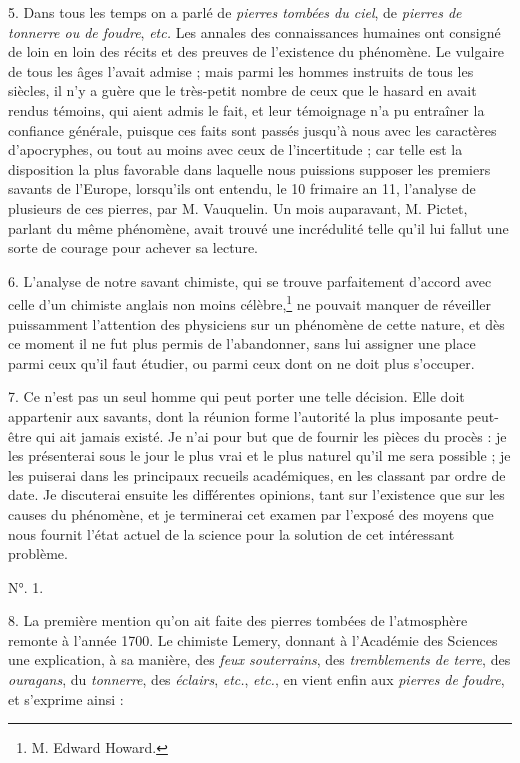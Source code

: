 \documentclass[a4paper, 11pt, oneside, polutonikogreek, french]{article}
\begin{document}
5. Dans tous les temps on a parlé de \emph{pierres tombées du ciel}, de \emph{pierres de tonnerre ou de foudre}, \emph{etc.} Les annales des connaissances humaines ont consigné de loin en loin des récits et des preuves de l'existence du phénomène. Le vulgaire de tous les âges l'avait admise ; mais parmi les hommes instruits de tous les siècles, il n'y a guère que le très-petit nombre de ceux que le hasard en avait rendus témoins, qui aient admis le fait, et leur témoignage n'a pu entraîner la confiance générale, puisque ces faits sont passés jusqu'à nous avec les caractères d'apocryphes, ou tout au moins avec ceux de l'incertitude ; car telle est la disposition la plus favorable dans laquelle nous puissions supposer les premiers savants de l'Europe, lorsqu'ils ont entendu, le 10 frimaire an 11, l'analyse de plusieurs de ces pierres, par M. Vauquelin. Un mois auparavant, M. Pictet, parlant du même phénomène, avait trouvé une incrédulité telle qu'il lui fallut une sorte de courage pour achever sa lecture.

6. L'analyse de notre savant chimiste, qui se trouve parfaitement d'accord avec celle d'un chimiste anglais non moins célèbre,\footnote{M. Edward Howard.} ne pouvait manquer de réveiller puissamment l'attention des physiciens sur un phénomène de cette nature, et dès ce moment il ne fut plus permis de l'abandonner, sans lui assigner une place parmi ceux qu'il faut étudier, ou parmi ceux dont on ne doit plus s'occuper.

7. Ce n'est pas un seul homme qui peut porter une telle décision. Elle doit appartenir aux savants, dont la réunion forme l'autorité la plus imposante peut-être qui ait jamais existé. Je n'ai pour but que de fournir les pièces du procès : je les présenterai sous le jour le plus vrai et le plus naturel qu'il me sera possible ; je les puiserai dans les principaux recueils académiques, en les classant par ordre de date. Je discuterai ensuite les différentes opinions, tant sur l'existence que sur les causes du phénomène, et je terminerai cet examen par l'exposé des moyens que nous fournit l'état actuel de la science pour la solution de cet intéressant problème.

\begin{center}
N°. 1.
\end{center}

8. La première mention qu'on ait faite des pierres tombées de l'atmosphère remonte à l'année 1700. Le chimiste Lemery, donnant à l'Académie des Sciences une explication, à sa manière, des \emph{feux souterrains}, des \emph{tremblements de terre}, des \emph{ouragans}, du \emph{tonnerre}, des \emph{éclairs}, \emph{etc.}, \emph{etc.}, en vient enfin aux \emph{pierres de foudre}, et s'exprime ainsi :
\end{document}
